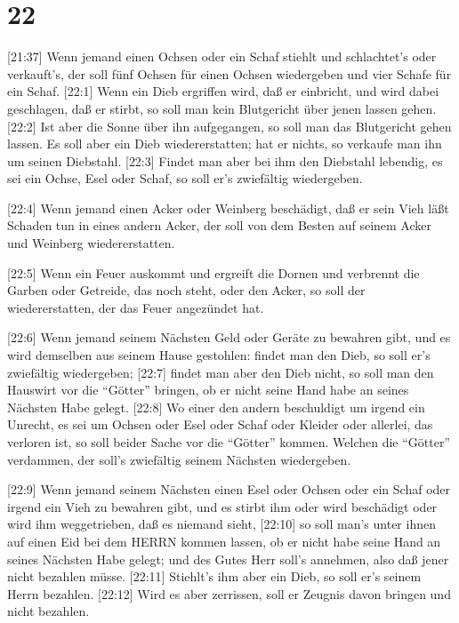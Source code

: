 \hypertarget{section-21}{%
\section{22}\label{section-21}}

 {[}21:37{]} Wenn jemand einen Ochsen oder ein Schaf stiehlt
und schlachtet's oder verkauft's, der soll fünf Ochsen für einen Ochsen
wiedergeben und vier Schafe für ein Schaf.  {[}22:1{]} Wenn
ein Dieb ergriffen wird, daß er einbricht, und wird dabei geschlagen,
daß er stirbt, so soll man kein Blutgericht über jenen lassen gehen.
 {[}22:2{]} Ist aber die Sonne über ihn aufgegangen, so soll
man das Blutgericht gehen lassen. Es soll aber ein Dieb wiedererstatten;
hat er nichts, so verkaufe man ihn um seinen Diebstahl. 
{[}22:3{]} Findet man aber bei ihm den Diebstahl lebendig, es sei ein
Ochse, Esel oder Schaf, so soll er's zwiefältig wiedergeben.

 {[}22:4{]} Wenn jemand einen Acker oder Weinberg
beschädigt, daß er sein Vieh läßt Schaden tun in eines andern Acker, der
soll von dem Besten auf seinem Acker und Weinberg wiedererstatten.

 {[}22:5{]} Wenn ein Feuer auskommt und ergreift die Dornen
und verbrennt die Garben oder Getreide, das noch steht, oder den Acker,
so soll der wiedererstatten, der das Feuer angezündet hat.

 {[}22:6{]} Wenn jemand seinem Nächsten Geld oder Geräte zu
bewahren gibt, und es wird demselben aus seinem Hause gestohlen: findet
man den Dieb, so soll er's zwiefältig wiedergeben; 
{[}22:7{]} findet man aber den Dieb nicht, so soll man den Hauswirt vor
die ``Götter'' bringen, ob er nicht seine Hand habe an seines Nächsten
Habe gelegt.  {[}22:8{]} Wo einer den andern beschuldigt um
irgend ein Unrecht, es sei um Ochsen oder Esel oder Schaf oder Kleider
oder allerlei, das verloren ist, so soll beider Sache vor die ``Götter''
kommen. Welchen die ``Götter'' verdammen, der soll's zwiefältig seinem
Nächsten wiedergeben.

 {[}22:9{]} Wenn jemand seinem Nächsten einen Esel oder
Ochsen oder ein Schaf oder irgend ein Vieh zu bewahren gibt, und es
stirbt ihm oder wird beschädigt oder wird ihm weggetrieben, daß es
niemand sieht,  {[}22:10{]} so soll man's unter ihnen auf
einen Eid bei dem HERRN kommen lassen, ob er nicht habe seine Hand an
seines Nächsten Habe gelegt; und des Gutes Herr soll's annehmen, also
daß jener nicht bezahlen müsse.  {[}22:11{]} Stiehlt's ihm
aber ein Dieb, so soll er's seinem Herrn bezahlen. 
{[}22:12{]} Wird es aber zerrissen, soll er Zeugnis davon bringen und
nicht bezahlen.

